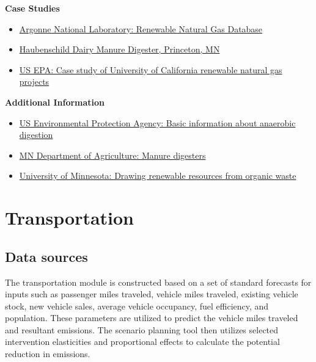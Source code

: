 \documentclass[
]{book}
\providecommand{\tightlist}{%
  \setlength{\itemsep}{0pt}\setlength{\parskip}{0pt}}
\begin{document}
\textbf{Case Studies}

\begin{itemize}
\tightlist
\item
  \href{https://www.anl.gov/es/reference/renewable-natural-gas-database}{Argonne National Laboratory: Renewable Natural Gas Database}
\item
  \href{https://www.mda.state.mn.us/manure-digester-case-study-haubenschild-farm}{Haubenschild Dairy Manure Digester, Princeton, MN}
\item
  \href{https://www.epa.gov/lmop/webinar-case-study-university-california-renewable-natural-gas-projects}{US EPA: Case study of University of California renewable natural gas projects}
\end{itemize}

\textbf{Additional Information}

\begin{itemize}
\tightlist
\item
  \href{https://www.epa.gov/anaerobic-digestion/basic-information-about-anaerobic-digestion-ad}{US Environmental Protection Agency: Basic information about anaerobic digestion}\\
\item
  \href{https://www.mda.state.mn.us/environment-sustainability/manure-digesters}{MN Department of Agriculture: Manure digesters}
\item
  \href{https://research.umn.edu/inquiry/post/drawing-renewable-resources-organic-waste}{University of Minnesota: Drawing renewable resources from organic waste}
\end{itemize}

\hypertarget{transportation-1}{%
\section{Transportation}\label{transportation-1}}

\hypertarget{data-sources}{%
\subsection{Data sources}\label{data-sources}}

The transportation module is constructed based on a set of standard forecasts for inputs such as passenger miles traveled, vehicle miles traveled, existing vehicle stock, new vehicle sales, average vehicle occupancy, fuel efficiency, and population. These parameters are utilized to predict the vehicle miles traveled and resultant emissions. The scenario planning tool then utilizes selected intervention elasticities and proportional effects to calculate the potential reduction in emissions.
\end{document}
